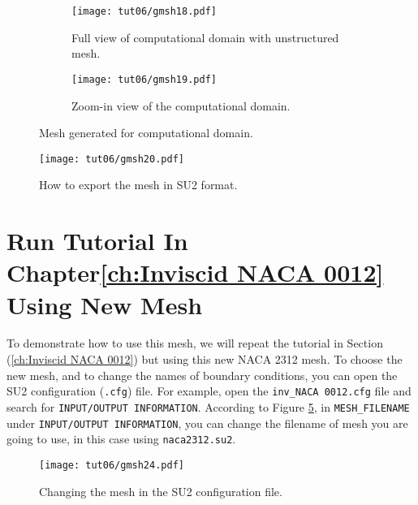 \begin{figure}[ht]
    \centering
     \begin{subfigure}[b]{.5\textwidth}
         \centering
         \texttt{[image: tut06/gmsh18.pdf]}
         \caption{Full view of computational domain with unstructured mesh.}
         \label{fig6:gmsh18 a}
     \end{subfigure}
     \hfill
     \begin{subfigure}[b]{.5\textwidth}
         \centering
         \texttt{[image: tut06/gmsh19.pdf]}
         \caption{Zoom-in view of the computational domain.}
         \label{fig6:gmsh18 b}
     \end{subfigure}  
    \caption{Mesh generated for computational domain.}
    \label{fig6:gmsh18}
\end{figure}
\begin{figure}[H]
    \centering
    \texttt{[image: tut06/gmsh20.pdf]}
    \caption{How to export the mesh in SU2 format.}
    \label{fig6:gmsh20}
\end{figure}
\section{Run Tutorial In Chapter\ref{ch:Inviscid NACA 0012} Using New Mesh}
To demonstrate how to use this mesh, we will repeat the tutorial in Section (\ref{ch:Inviscid NACA 0012}) but using this new NACA 2312 mesh. To choose the new mesh, and to change the names of boundary conditions, you can open the SU2 configuration (\texttt{.cfg}) file. For example, open the \texttt{inv\_NACA 0012.cfg} file and search for \texttt{INPUT/OUTPUT INFORMATION}. According to Figure \ref{fig6:gmsh24}, in \texttt{MESH\_FILENAME} under \texttt{INPUT/OUTPUT INFORMATION}, you can change the filename of mesh you are going to use, in this case using \texttt{naca2312.su2}.
\begin{figure}[ht]
    \centering
    \texttt{[image: tut06/gmsh24.pdf]}
    \caption{Changing the mesh in the SU2 configuration file.}
    \label{fig6:gmsh24}
\end{figure}

